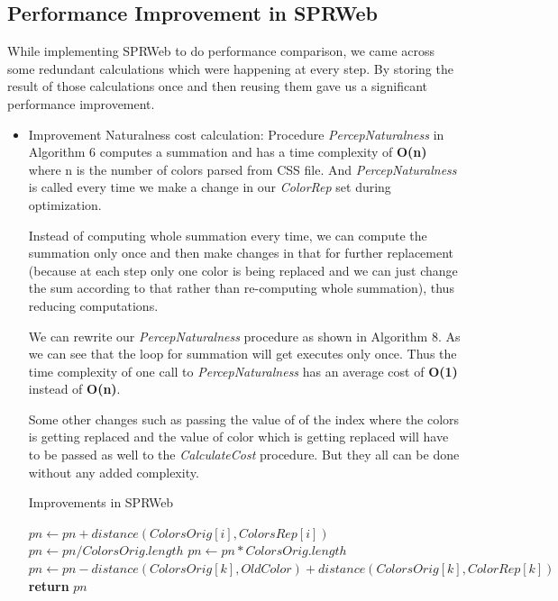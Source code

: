 \subsection{Performance Improvement in SPRWeb} 
\label{Improvement in SPRWeb}



While implementing SPRWeb to do performance comparison, we came across some redundant calculations which were happening at every step. By storing the result of those calculations once and then reusing them gave us a significant performance improvement.

\begin{itemize}
\item {Improvement Naturalness cost calculation:} Procedure \textit{PercepNaturalness} in Algorithm 6 computes a summation and has a time complexity of \textbf{O(n)} where n is the number of colors parsed from CSS file. And \textit{PercepNaturalness} is called every time we make a change in our \textit{ColorRep} set during optimization.

Instead of computing whole summation every time, we can compute the summation only once and then make changes in that for further replacement (because at each step only one color is being replaced and we can just change the sum according to that rather than re-computing whole summation), thus reducing computations.

We can rewrite our \textit{PercepNaturalness} procedure as shown in Algorithm 8. As we can see that the  loop for summation will get executes only once. Thus the time complexity of one call to \textit{PercepNaturalness} has an average cost of \textbf{O(1)} instead of \textbf{O(n)}.

Some other changes such as passing the value of of the index where the colors is getting replaced and the value of color which is getting replaced will have to be passed as well to the \textit{CalculateCost} procedure. But they all can be done without any added complexity. 

\begin{algorithm}[!htb]
\caption{Improvements in SPRWeb}\label{Improvements Naturalness}
\begin{algorithmic}[1]
 
  
			\State $pn \gets pn + distance(ColorsOrig[i],ColorsRep[i])$
		\EndFor
	\State $pn \gets pn/ColorsOrig.length$
\Else
\State $pn \gets pn*ColorsOrig.length$
\State $pn  \gets pn - distance(ColorsOrig[k],OldColor) + distance(ColorsOrig[k],ColorRep[k])$ 
\EndIf
\State \textbf{return} $pn$
\EndProcedure
\end{algorithmic}
\end{algorithm}


\end{itemize}
